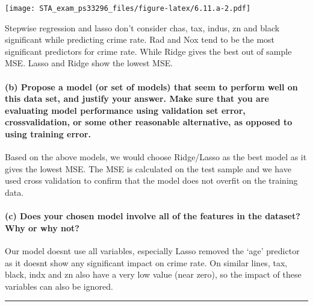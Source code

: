 \documentclass[
]{article}
\begin{document}
\texttt{[image: STA\_exam\_ps33296\_files/figure-latex/6.11.a-2.pdf]}

Stepwise regression and lasso don't consider chas, tax, indus, zn and
black significant while predicting crime rate. Rad and Nox tend to be
the most significant predictors for crime rate. While Ridge gives the
best out of sample MSE. Lasso and Ridge show the lowest MSE.

\hypertarget{b-propose-a-model-or-set-of-models-that-seem-to-perform-well-on-this-data-set-and-justify-your-answer.-make-sure-that-you-are-evaluating-model-performance-using-validation-set-error-crossvalidation-or-some-other-reasonable-alternative-as-opposed-to-using-training-error.}{%
\paragraph{(b) Propose a model (or set of models) that seem to perform
well on this data set, and justify your answer. Make sure that you are
evaluating model performance using validation set error,
crossvalidation, or some other reasonable alternative, as opposed to
using training
error.}\label{b-propose-a-model-or-set-of-models-that-seem-to-perform-well-on-this-data-set-and-justify-your-answer.-make-sure-that-you-are-evaluating-model-performance-using-validation-set-error-crossvalidation-or-some-other-reasonable-alternative-as-opposed-to-using-training-error.}}

Based on the above models, we would choose Ridge/Lasso as the best model
as it gives the lowest MSE. The MSE is calculated on the test sample and
we have used cross validation to confirm that the model does not overfit
on the training data.

\hypertarget{c-does-your-chosen-model-involve-all-of-the-features-in-the-dataset-why-or-why-not}{%
\paragraph{(c) Does your chosen model involve all of the features in the
dataset? Why or why
not?}\label{c-does-your-chosen-model-involve-all-of-the-features-in-the-dataset-why-or-why-not}}

Our model doesnt use all variables, especially Lasso removed the `age'
predictor as it doesnt show any significant impact on crime rate. On
similar lines, tax, black, indx and zn also have a very low value (near
zero), so the impact of these variables can also be ignored.

\begin{center}\rule{0.5\linewidth}{0.5pt}\end{center}
\end{document}
